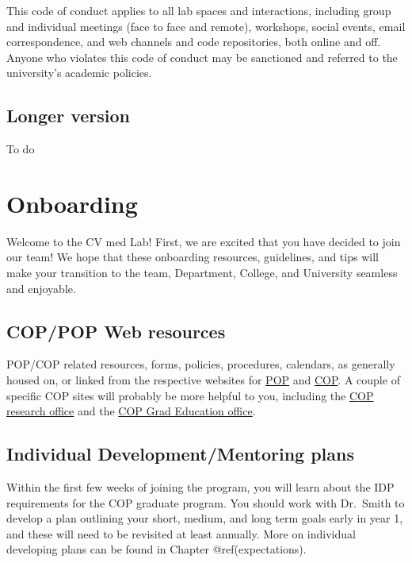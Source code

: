 \documentclass[
  letterpaper,
  DIV=11,
  numbers=noendperiod]{scrreprt}
\begin{document}
This code of conduct applies to all lab spaces and interactions,
including group and individual meetings (face to face and remote),
workshops, social events, email correspondence, and web channels and
code repositories, both online and off. Anyone who violates this code of
conduct may be sanctioned and referred to the university's academic
policies.

\hypertarget{longer-version}{%
\section{Longer version}\label{longer-version}}

To do


\hypertarget{onboarding}{%
\chapter{Onboarding}\label{onboarding}}

Welcome to the CV med Lab! First, we are excited that you have decided
to join our team! We hope that these onboarding resources, guidelines,
and tips will make your transition to the team, Department, College, and
University seamless and enjoyable.

\hypertarget{coppop-web-resources}{%
\section{COP/POP Web resources}\label{coppop-web-resources}}

POP/COP related resources, forms, policies, procedures, calendars, as
generally housed on, or linked from the respective websites for
\href{https://pop.pharmacy.ufl.edu/}{POP} and
\href{https://pharmacy.ufl.edu/}{COP}. A couple of specific COP sites
will probably be more helpful to you, including the
\href{https://pharmacy.ufl.edu/research/cop-research-office/}{COP
research office} and the
\href{https://graduateeducation.pharmacy.ufl.edu/}{COP Grad Education
office}.

\hypertarget{individual-developmentmentoring-plans}{%
\section{Individual Development/Mentoring
plans}\label{individual-developmentmentoring-plans}}

Within the first few weeks of joining the program, you will learn about
the IDP requirements for the COP graduate program. You should work with
Dr.~Smith to develop a plan outlining your short, medium, and long term
goals early in year 1, and these will need to be revisited at least
annually. More on individual developing plans can be found in Chapter
@ref(expectations).
\end{document}
